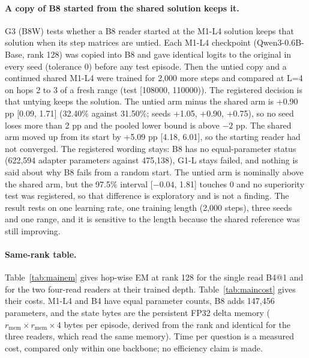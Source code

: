 \paragraph{A copy of B8 started from the shared solution keeps it.}
G3 (B8W) tests whether a B8 reader started at the M1-L4 solution keeps that solution when its step matrices are untied.
Each M1-L4 checkpoint (Qwen3-0.6B-Base, rank 128) was copied into B8 and gave identical logits to the original in every seed (tolerance 0) before any test episode.
Then the untied copy and a continued shared M1-L4 were trained for 2,000 more steps and compared at L=4 on hops 2 to 3 of a fresh range (test [108000, 110000)).
The registered decision is that untying keeps the solution.
The untied arm minus the shared arm is +0.90 pp [0.09, 1.71] (32.40\% against 31.50\%; seeds +1.05, +0.90, +0.75), so no seed loses more than 2 pp and the pooled lower bound is above $-2$ pp.  %
The shared arm moved up from its start by +5.09 pp [4.18, 6.01], so the starting reader had not converged.  %
The registered wording stays: B8 has no equal-parameter status (622,594 adapter parameters against 475,138), G1-L stays failed, and nothing is said about why B8 fails from a random start.  %
The untied arm is nominally above the shared arm, but the 97.5\% interval [$-0.04$, 1.81] touches 0 and no superiority test was registered, so that difference is exploratory and is not a finding.  %
The result rests on one learning rate, one training length (2,000 steps), three seeds and one range, and it is sensitive to the length because the shared reference was still improving.  %

\paragraph{Same-rank table.}
Table~\ref{tab:mainem} gives hop-wise EM at rank 128 for the single read B4@1 and for the two four-read readers at their trained depth.
Table~\ref{tab:maincost} gives their costs.
M1-L4 and B4 have equal parameter counts, B8 adds 147,456 parameters, and the state bytes are the persistent FP32 delta memory ($r_{\mathrm{mem}}\times r_{\mathrm{mem}}\times 4$ bytes per episode, derived from the rank and identical for the three readers, which read the same memory).  %
Time per question is a measured cost, compared only within one backbone; no efficiency claim is made.  %

\begin{table}[htbp]
\centering\footnotesize
\caption{Exact-match accuracy (\%) by hop at rank 128, primary setting, seed means of three training seeds, one oracle seed.  %
}
\label{tab:mainem}
\gtMainEM
\end{table}

